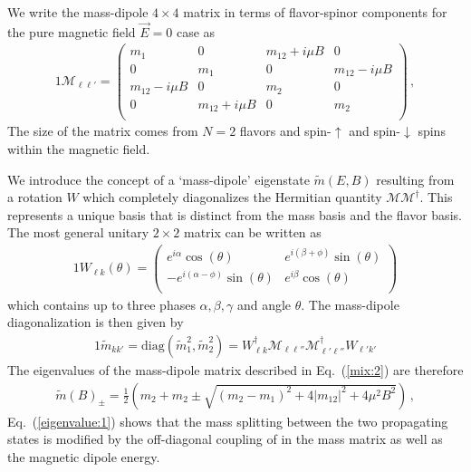 \documentclass[addchapnum]{ws-rv961x669} %
\newcommand{\req}[1]{Eq.~(\ref{#1})}
\begin{document}
We write the mass-dipole $4\times4$ matrix in terms of flavor-spinor components for the pure magnetic field $\vec{E}=0$ case as
\begin{alignat}{1}
	\label{mix:2} \mathcal{M}_{\ell\ell'} = 
	\begin{pmatrix}
		m_{1} & 0 & m_{12}+i\mu B & 0\\
        0 & m_{1} & 0 & m_{12}-i\mu B\\
        m_{12}-i\mu B & 0 & m_{2} & 0\\
        0 & m_{12}+i\mu B & 0 & m_{2}\\
	\end{pmatrix}\,,
\end{alignat}
The size of the matrix comes from $N=2$ flavors and spin-$\uparrow$ and spin-$\downarrow$ spins within the magnetic field.

We introduce the concept of a `mass-dipole' eigenstate $\tilde{m}(E,B)$ resulting from a rotation $W$ which completely diagonalizes the Hermitian quantity $\mathcal{M}\mathcal{M}^{\dag}$. This represents a unique basis that is distinct from the mass basis and the flavor basis. The most general unitary $2\times2$ matrix can be written as
\begin{alignat}{1}
	\label{mix:4} W_{\ell k}(\theta) = 
    \left(
    \begin{array}{cc}
         e^{i \alpha } \cos (\theta ) & e^{i (\beta +\phi )} \sin (\theta ) \\
         -e^{i (\alpha -\phi )} \sin (\theta ) & e^{i \beta } \cos (\theta ) \\
    \end{array}
    \right)
\end{alignat}
which contains up to three phases $\alpha,\beta,\gamma$ and angle $\theta$. The mass-dipole diagonalization is then given by
\begin{alignat}{1}
	\label{mix:5} \tilde{m}_{kk'} = \mathrm{diag}(\tilde{m}_{1}^{2},\tilde{m}_{2}^{2})=W_{\ell k}^{\dag}\mathcal{M}_{\ell\ell''}\mathcal{M}_{\ell'\ell''}^{\dag}W_{\ell'k'}
\end{alignat}
The eigenvalues of the mass-dipole matrix described in \req{mix:2} are therefore
\begin{align}
    \label{eigenvalue:1}
    \tilde{m}(B)_{\pm}=\frac{1}{2}\left(m_{2}+m_{2}\pm\sqrt{(m_{2}-m_{1})^{2}+4\left\rvert m_{12}\right\rvert^{2}+4\mu^{2}B^{2}}\right)\,,
\end{align}
\req{eigenvalue:1} shows that the mass splitting between the two propagating states is modified by the off-diagonal coupling of in the mass matrix as well as the magnetic dipole energy.
\end{document}
